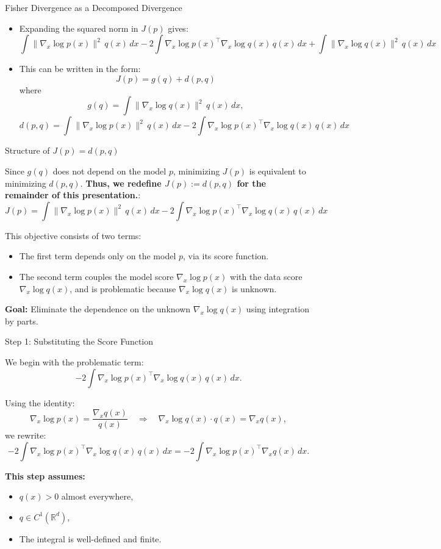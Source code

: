 \documentclass[aspectratio=169]{beamer}
\begin{document}
\begin{frame}{Fisher Divergence as a Decomposed Divergence}

\begin{itemize}
  \item Expanding the squared norm in $J(p)$ gives:
  \[
\int \|\nabla_x \log p(x)\|^2 \, q(x) \, dx
  - 2 \int \nabla_x \log p(x)^\top \nabla_x \log q(x)\, q(x) \, dx
  + \int \|\nabla_x \log q(x)\|^2 \, q(x) \, dx
  \]
  \item This can be written in the form:
  \[
 J(p) = g(q) + d(p, q)
  \]
  where
  \[
  g(q) = \int \|\nabla_x \log q(x)\|^2 \, q(x) \, dx,
  \]
  \[
  d(p, q) = \int \|\nabla_x \log p(x)\|^2 \, q(x) \, dx
  - 2 \int \nabla_x \log p(x)^\top \nabla_x \log q(x) \, q(x) \, dx
  \]

\end{itemize}
\end{frame}
\begin{frame}{Structure of \( J(p) = d(p, q) \)}

Since \( g(q) \) does not depend on the model \( p \), minimizing \( J(p) \) is equivalent to minimizing \( d(p, q) \).  
  \textbf{Thus, we redefine \( J(p) := d(p, q) \) for the remainder of this presentation.}:
\[
J(p) = \int \|\nabla_x \log p(x)\|^2 \, q(x) \, dx
- 2 \int \nabla_x \log p(x)^\top \nabla_x \log q(x) \, q(x) \, dx
\]

\vspace{1em}
This objective consists of two terms:
\begin{itemize}
  \item The first term depends only on the model \( p \), via its score function.
  \item The second term couples the model score \( \nabla_x \log p(x) \) with the data score \( \nabla_x \log q(x) \), and is problematic because \( \nabla_x \log q(x) \) is unknown.
\end{itemize}

\vspace{1em}
\textbf{Goal:} Eliminate the dependence on the unknown \( \nabla_x \log q(x) \) using integration by parts.
\end{frame}
\begin{frame}{Step 1: Substituting the Score Function}

We begin with the problematic term:
\[
-2 \int \nabla_x \log p(x)^\top \nabla_x \log q(x) \, q(x) \, dx.
\]

Using the identity:
\[
\nabla_x \log p(x) = \frac{\nabla_x q(x)}{q(x)}
\quad \Rightarrow \quad
\nabla_x \log q(x) \cdot q(x) = \nabla_x q(x),
\]
we rewrite:
\[
-2 \int \nabla_x \log p(x)^\top \nabla_x \log q(x) \, q(x) \, dx
= -2 \int  \nabla_x \log p(x)^\top \nabla_x q(x)\, dx.
\]

\vspace{1em}
\textbf{This step assumes:}
\begin{itemize}
  \item \( q(x) > 0 \) almost everywhere,
  \item \( q \in C^1(\mathbb{R}^d) \),
  \item The integral is well-defined and finite.
\end{itemize}
\end{frame}
\end{document}
